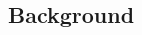 \documentclass[a4paper,twoside,11pt, pagesize]{scrartcl}
\begin{document}
\begin{spacing}{1.2}
\section{Background}

\end{spacing}
\end{document}
